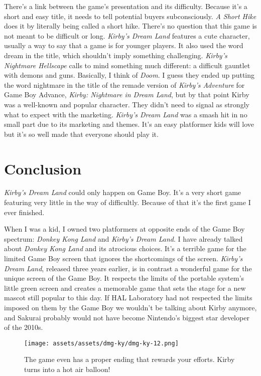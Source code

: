 \documentclass{book}
\begin{document}
There’s a link between the game’s presentation and its difficulty. Because it’s a short and easy title, it needs to tell potential buyers subconsciously. \emph{A Short Hike} does it by literally being called a short hike. There’s no question that this game is not meant to be difficult or long. \emph{Kirby’s Dream Land} features a cute character, usually a way to say that a game is for younger players. It also used the word dream in the title, which shouldn’t imply something challenging. \emph{Kirby’s Nightmare Hellscape} calls to mind something much different: a difficult gauntlet with demons and guns. Basically, I think of \emph{Doom}. I guess they ended up putting the word nightmare in the title of the remade version of \emph{Kirby’s Adventure} for Game Boy Advance, \emph{Kirby: Nightmare in Dream Land}, but by that point Kirby was a well-known and popular character. They didn’t need to signal as strongly what to expect with the marketing. \emph{Kirby’s Dream Land} was a smash hit in no small part due to its marketing and themes. It’s an easy platformer kids will love but it’s so well made that everyone should play it.

\FloatBarrier\needspace{10mm}\section*{Conclusion}\nopagebreak[4]

\emph{Kirby’s Dream Land} could only happen on Game Boy. It’s a very short game featuring very little in the way of difficultly. Because of that it’s the first game I ever finished.

When I was a kid, I owned two platformers at opposite ends of the Game Boy spectrum: \emph{Donkey Kong Land} and \emph{Kirby’s Dream Land}. I have already talked about \emph{Donkey Kong Land} and its atrocious choices. It’s a terrible game for the limited Game Boy screen that ignores the shortcomings of the screen. \emph{Kirby’s Dream Land}, released three years earlier, is in contrast a wonderful game for the unique screen of the Game Boy. It respects the limits of the portable system’s little green screen and creates a memorable game that sets the stage for a new mascot still popular to this day. If HAL Laboratory had not respected the limits imposed on them by the Game Boy we wouldn’t be talking about Kirby anymore, and Sakurai probably would not have become Nintendo’s biggest star developer of the 2010s.

\begin{figure}[hbt]
\vskip 10pt
\centering \texttt{[image: assets/assets/dmg-ky/dmg-ky-12.png]}\par\pagetwodescription The game even has a proper ending that rewards your efforts. Kirby turns into a hot air balloon!
\vskip 6pt
\end{figure}
\end{document}
